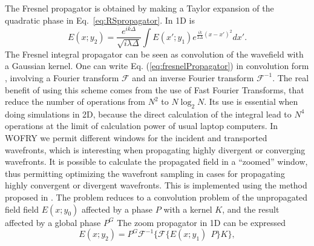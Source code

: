 \documentclass{iopconfser}
\begin{document}
The Fresnel propagator is obtained by making a Taylor expansion of the quadratic phase in Eq.~\ref{eq:RSpropagator}. In 1D is 
\begin{equation}\label{eq:fresnelPropagator}
E(x;y_2) =  \frac{e^{i k \Delta}}{\sqrt{i \lambda \Delta}} \int E(x';y_1) e^{ \frac{i k}{2 \Delta}  (x-x')^2  }  dx'.
\end{equation}
The Fresnel integral propagator can be seen as convolution of the wavefield with a Gaussian kernel. One can write Eq. (\ref{eq:fresnelPropagator}) in convolution form \cite{goodmanfourier}, involving a Fourier transform $\mathcal{F}$ and an inverse Fourier transform $\mathcal{F}^{-1}$. The real benefit of using this scheme comes from the use of Fast Fourier Transforms, that reduce the number of operations from $N^2$ to $N \log_2 N$. Its use is essential when doing simulations in 2D, because the direct calculation of the integral lead to $N^4$ operations at the limit of calculation power of usual laptop computers.
In WOFRY we permit different windows for the incident and transported wavefronts, which is interesting when propagating highly divergent or converging wavefronts. It is possible to calculate the propagated field in a ``zoomed'' window, thus permitting optimizing the wavefront sampling in cases for propagating highly convergent or divergent wavefronts. This is implemented using the method proposed in \cite{schmidt}. The problem reduces to a convolution problem of the unpropagated field field $E(x;y_0)$ affected by a phase $P$ with a kernel $K$, and the result affected by a global phase $P^G$
%
%
The zoom propagator in 1D can be expressed 
\begin{equation}
E(x; y_2) = P^G \mathcal{F}^{-1} \Big\{ \mathcal{F} \big\{ E(x;y_1)~~P \big\} K \Big\},
\end{equation}
\end{document}
